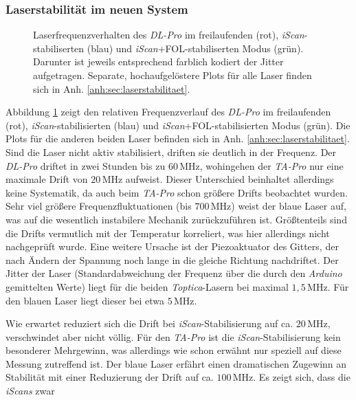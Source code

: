 \subsubsection{Laserstabilität im neuen
System}\label{subsubsec:stabilitaetsmessungen_software_neues_system}
\begin{figure}[h]
 	\centering
 	\footnotesize
	
	\caption[Laserfrequenzverhalten \textit{DL-Pro}]{Laserfrequenzverhalten des
	\textit{DL-Pro} im freilaufenden (rot), \textit{iScan}-stabiliserten (blau) und
	\textit{iScan}+FOL-stabiliserten Modus (grün). Darunter ist jeweils
	entsprechend farblich kodiert der Jitter aufgetragen. Separate,
	hochaufgelöstere Plots für alle Laser finden sich in Anh.
	\ref{anh:sec:laserstabilitaet}.}
	\label{fig:laserstabilitaet_b_alles}
\end{figure}
Abbildung \ref{fig:laserstabilitaet_b_alles} zeigt den relativen
Frequenzverlauf des \textit{DL-Pro} im freilaufenden (rot),
\textit{iScan}-stabilisierten (blau) und \textit{iScan}+FOL-stabilisierten Modus
(grün). Die Plots für die anderen beiden Laser befinden sich in Anh.
\ref{anh:sec:laserstabilitaet}. Sind die Laser nicht aktiv stabilisiert, driften
sie deutlich in der Frequenz. Der \textit{DL-Pro} driftet in zwei Stunden bis zu $60\,$MHz, wohingehen der
\textit{TA-Pro} nur eine maximale Drift von $20\,$MHz aufweist. Dieser
Unterschied beinhaltet allerdings keine Systematik, da auch beim \textit{TA-Pro}
schon größere Drifts beobachtet wurden. Sehr viel größere Frequenzfluktuationen (bis $700\,$MHz)
weist der blaue Laser auf, was auf die wesentlich instabilere Mechanik
zurückzuführen ist. Größtenteils sind die Drifts vermutlich mit der Temperatur
korreliert, was hier allerdings nicht nachgeprüft wurde. Eine weitere Ursache
ist der Piezoaktuator des Gitters, der nach Ändern der Spannung noch lange in
die gleiche Richtung nachdriftet. Der Jitter der Laser (Standardabweichung der
Frequenz über die durch den \textit{Arduino} gemittelten Werte) liegt für die
beiden \textit{Toptica}-Lasern bei maximal $1,5\,$MHz. Für den blauen Laser
liegt dieser bei etwa $5\,$MHz.\par
Wie erwartet reduziert sich die Drift bei \textit{iScan}-Stabilisierung auf ca. $20\,$MHz,
verschwindet aber nicht völlig. Für den \textit{TA-Pro} ist die
\textit{iScan}-Stabilisierung kein besonderer Mehrgewinn, was allerdings wie
schon erwähnt nur speziell auf diese Messung zutreffend ist. Der blaue Laser
erfährt einen dramatischen Zugewinn an Stabilität mit einer Reduzierung der
Drift auf ca. $100\,$MHz. Es zeigt sich, dass die \textit{iScans} zwar
